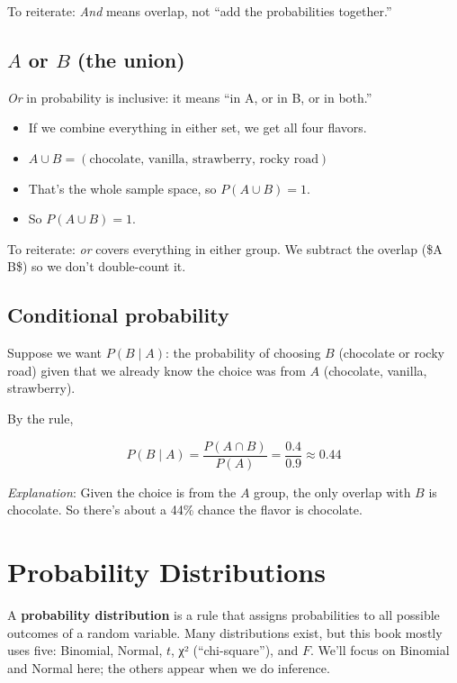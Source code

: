 \documentclass[
  letterpaper,
  DIV=11,
  numbers=noendperiod]{scrreprt}
\begin{document}
To reiterate: \emph{And} means overlap, not ``add the probabilities
together.''

\subsection{\texorpdfstring{\(A\) \textbf{or} \(B\) (the
union)}{A or B (the union)}}\label{a-or-b-the-union}

\emph{Or} in probability is inclusive: it means ``in A, or in B, or in
both.''

\begin{itemize}
\item
  If we combine everything in either set, we get all four flavors.
\item
  \(A \cup B = (\text{chocolate, vanilla, strawberry, rocky road})\)
\item
  That's the whole sample space, so \(P(A \cup B) = 1\).
\item
  So \(P(A \cup B) = 1\).
\end{itemize}

To reiterate: \emph{or} covers everything in either group. We subtract
the overlap (\$A \cap B\$) so we don't double-count it.

\subsection{\texorpdfstring{\textbf{Conditional
probability}}{Conditional probability}}\label{conditional-probability}

Suppose we want \(P(B \mid A)\): the probability of choosing \(B\)
(chocolate or rocky road) given that we already know the choice was from
\(A\) (chocolate, vanilla, strawberry).

By the rule,

\[P(B \mid A) = \frac{P(A \cap B)}{P(A)} = \frac{0.4}{0.9} \approx 0.44\]

\emph{Explanation}: Given the choice is from the \(A\) group, the only
overlap with \(B\) is chocolate. So there's about a 44\% chance the
flavor is chocolate.

\section{Probability Distributions}\label{probability-distributions}

A \textbf{probability distribution} is a rule that assigns probabilities
to all possible outcomes of a random variable. Many distributions exist,
but this book mostly uses five: Binomial, Normal, \(t\), χ²
(``chi-square''), and \(F\). We'll focus on Binomial and Normal here;
the others appear when we do inference.
\end{document}
